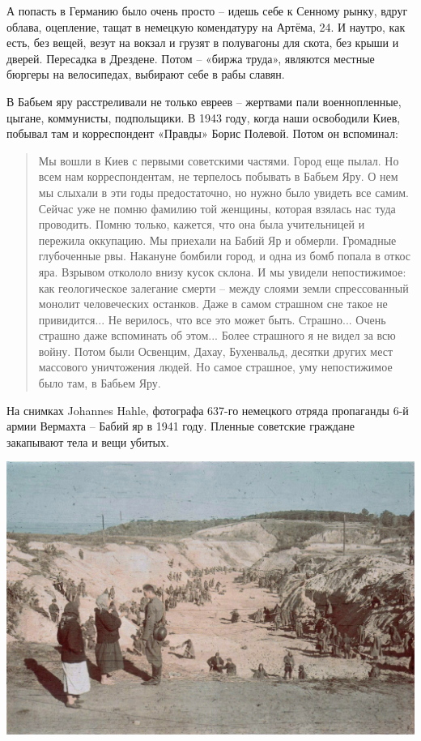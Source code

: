 А попасть в Германию было очень просто – идешь себе к Сенному рынку, вдруг облава, оцепление, тащат в немецкую комендатуру на Артёма, 24. И наутро, как есть, без вещей, везут на вокзал и грузят в полувагоны для скота, без крыши и дверей. Пересадка в Дрездене. Потом – «биржа труда», являются местные бюргеры на велосипедах, выбирают себе в рабы славян.

В Бабьем яру расстреливали не только евреев – жертвами пали военнопленные, цыгане, коммунисты, подпольщики. В 1943 году, когда наши освободили Киев, побывал там и корреспондент «Правды» Борис Полевой. Потом он вспоминал:

\begin{quotation}
Мы вошли в Киев с первыми советскими частями.  Город еще пылал. Но всем нам корреспондентам, не терпелось побывать в Бабьем Яру. О нем мы слыхали в эти годы предостаточно, но нужно было увидеть все самим. Сейчас уже не помню фамилию той женщины, которая взялась нас туда проводить. Помню только, кажется, что она была учительницей и пережила оккупацию. Мы приехали на Бабий Яр и обмерли. Громадные глубоченные рвы. Накануне бомбили город, и одна из бомб попала в откос яра. Взрывом откололо внизу кусок склона. И мы увидели непостижимое: как геологическое залегание смерти – между слоями земли спрессованный монолит человеческих останков. Даже в самом страшном сне такое не привидится... Не верилось, что все это может быть. Страшно... Очень страшно даже вспоминать об этом... Более страшного я не видел за всю войну. Потом были Освенцим, Дахау, Бухенвальд, десятки других мест массового уничтожения людей. Но самое страшное, уму непостижимое было там, в Бабьем Яру.
\end{quotation}

На снимках Johannes Hahle, фотографа 637-го немецкого отряда пропаганды 6-й армии Вермахта –  Бабий яр в 1941 году. Пленные советские граждане закапывают тела и вещи убитых.

\begin{center}
\includegraphics[width=\linewidth]{chast-zmiy/kurilo/byar-01.jpg}
\end{center}

